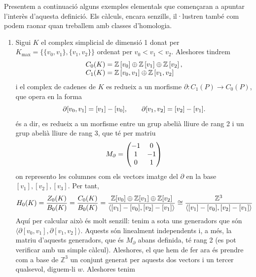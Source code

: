 \documentclass[../main.tex]{subfiles}
\begin{document}
Presentem a continuació alguns exemples elementals que començaran a apuntar l'interès d'aquesta definició. Els càlculs, encara senzills, il·lustren també com podem raonar quan treballem amb classes d'homologia.

\begin{ej}
\begin{enumerate}[(1)]
    \item Sigui $K$ el complex simplicial de dimensió 1 donat per $K_{\max} = \{\{v_0,v_1\},\{v_1,v_2\}\}$ ordenat per $v_0<v_1<v_2$. Aleshores tindrem
    \begin{equation}
        \notag
        \begin{array}{ll}
            C_0(K) = \mathbb{Z}\left[v_0\right]\oplus\mathbb{Z}\left[v_1\right]\oplus\mathbb{Z}\left[v_2\right],\\
            C_1(K) = \mathbb{Z}\left[v_0,v_1\right]\oplus\mathbb{Z}\left[v_1,v_2\right]
        \end{array}
    \end{equation}
    i el complex de cadenes de $K$ es redueix a un morfisme $\partial:C_1(P)\rightarrow C_0(P)$, que opera en la forma
    \begin{equation}
        \notag
        \partial[v_0,v_1] = [v_1]-[v_0],\qquad \partial[v_1,v_2] = [v_2]-[v_1].
    \end{equation}
    és a dir, es redueix a un morfisme entre un grup abelià lliure de rang 2 i un grup abelià lliure de rang 3, que té per matriu
    \begin{equation}
        \notag
        M_\partial = 
        \begin{pmatrix}
            -1 & 0 \\
            1 & -1 \\
            0 & 1
        \end{pmatrix}
    \end{equation}
    on represento les columnes com els vectors imatge del $\partial$ en la base $[v_1],[v_2],[v_3]$. Per tant,
    \begin{equation}
        \notag
        H_0(K) = \frac{Z_0(K)}{B_0(K)} = \frac{C_0(K)}{B_0(K)} = \frac{\mathbb{Z}[v_0]\oplus\mathbb{Z}[v_1]\oplus\mathbb{Z}[v_2]}{\langle [v_1]-[v_0], [v_2]-[v_1]\rangle}\cong\frac{\mathbb{Z}^3}{\langle [v_1]-[v_0], [v_2]-[v_1]\rangle}
    \end{equation}
    Aquí per calcular això és molt senzill: tenim a sota uns generadors que són $\langle\partial[v_0,v_1], \partial[v_1,v_2]\rangle$. Aquests són linealment independents i, a més, la matriu d'aquests generadors, que és $M_\partial$ abans definida, té rang 2 (es pot verificar amb un simple càlcul). Aleshores, el que hem de fer ara és prendre com a base de $\mathbb{Z}^3$ un conjunt generat per aquests dos vectors i un tercer qualsevol, diguem-li $w$. Aleshores tenim

\end{enumerate}
\end{ej}
\end{document}
